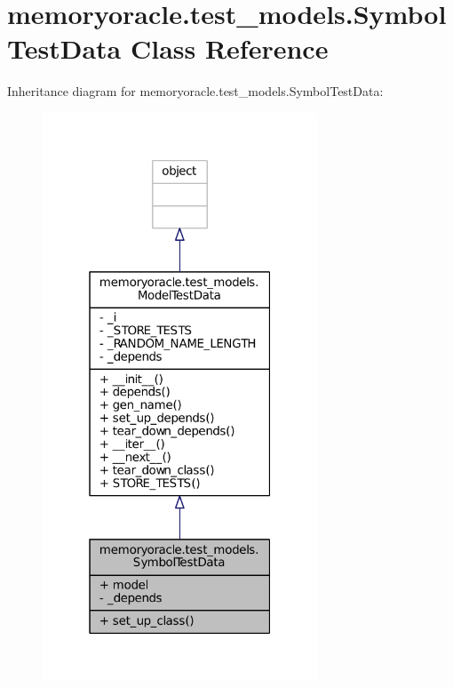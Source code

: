 \hypertarget{classmemoryoracle_1_1test__models_1_1SymbolTestData}{}\section{memoryoracle.\+test\+\_\+models.\+Symbol\+Test\+Data Class Reference}
\label{classmemoryoracle_1_1test__models_1_1SymbolTestData}


Inheritance diagram for memoryoracle.\+test\+\_\+models.\+Symbol\+Test\+Data\+:\nopagebreak
\begin{figure}[H]
\begin{center}
\leavevmode
\includegraphics[width=232pt]{classmemoryoracle_1_1test__models_1_1SymbolTestData__inherit__graph}
\end{center}
\end{figure}



